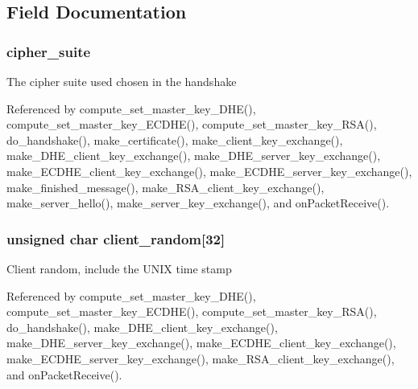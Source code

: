 \subsection{Field Documentation}
\subsubsection[{\texorpdfstring{cipher\+\_\+suite}{cipher_suite}}]{ cipher\+\_\+suite}\hypertarget{struct_t_l_s__parameters__t_af1d8ebe57a775be2b91550dbcacb2a58}{}\label{struct_t_l_s__parameters__t_af1d8ebe57a775be2b91550dbcacb2a58}
The cipher suite used chosen in the handshake 

Referenced by compute\+\_\+set\+\_\+master\+\_\+key\+\_\+\+D\+H\+E(), compute\+\_\+set\+\_\+master\+\_\+key\+\_\+\+E\+C\+D\+H\+E(), compute\+\_\+set\+\_\+master\+\_\+key\+\_\+\+R\+S\+A(), do\+\_\+handshake(), make\+\_\+certificate(), make\+\_\+client\+\_\+key\+\_\+exchange(), make\+\_\+\+D\+H\+E\+\_\+client\+\_\+key\+\_\+exchange(), make\+\_\+\+D\+H\+E\+\_\+server\+\_\+key\+\_\+exchange(), make\+\_\+\+E\+C\+D\+H\+E\+\_\+client\+\_\+key\+\_\+exchange(), make\+\_\+\+E\+C\+D\+H\+E\+\_\+server\+\_\+key\+\_\+exchange(), make\+\_\+finished\+\_\+message(), make\+\_\+\+R\+S\+A\+\_\+client\+\_\+key\+\_\+exchange(), make\+\_\+server\+\_\+hello(), make\+\_\+server\+\_\+key\+\_\+exchange(), and on\+Packet\+Receive().

\subsubsection[{\texorpdfstring{client\+\_\+random}{client_random}}]{\setlength{\rightskip}{0pt plus 5cm}unsigned char client\+\_\+random\mbox{[}32\mbox{]}}\hypertarget{struct_t_l_s__parameters__t_adbdca8d573a8e073ef16bf14229fb4c9}{}\label{struct_t_l_s__parameters__t_adbdca8d573a8e073ef16bf14229fb4c9}
Client random, include the U\+N\+IX time stamp 

Referenced by compute\+\_\+set\+\_\+master\+\_\+key\+\_\+\+D\+H\+E(), compute\+\_\+set\+\_\+master\+\_\+key\+\_\+\+E\+C\+D\+H\+E(), compute\+\_\+set\+\_\+master\+\_\+key\+\_\+\+R\+S\+A(), do\+\_\+handshake(), make\+\_\+\+D\+H\+E\+\_\+client\+\_\+key\+\_\+exchange(), make\+\_\+\+D\+H\+E\+\_\+server\+\_\+key\+\_\+exchange(), make\+\_\+\+E\+C\+D\+H\+E\+\_\+client\+\_\+key\+\_\+exchange(), make\+\_\+\+E\+C\+D\+H\+E\+\_\+server\+\_\+key\+\_\+exchange(), make\+\_\+\+R\+S\+A\+\_\+client\+\_\+key\+\_\+exchange(), and on\+Packet\+Receive().

